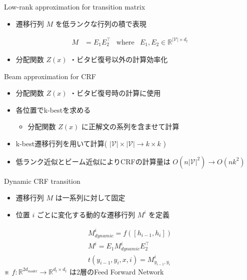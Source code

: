 \documentclass[unicode, 12pt, aspectratio=43]{beamer}
\begin{document}
\begin{frame}[label={sec:org3df3d15}]{\large Low-rank approximation for transition matrix}
\begin{itemize}
\item 遷移行列 \(M\) を低ランクな行列の積で表現
\end{itemize}

\begin{align*}
    M &= E_1 E_2^\top & \mathrm{where} & E_1, E_2 \in \mathbb{R}^{|\mathcal{V}|\times d_t}
\end{align*}
\begin{itemize}
\item 分配関数 \(Z(x)\) ・ビタビ復号以外の計算効率化
\end{itemize}
\end{frame}

\begin{frame}[label={sec:orgf891c50}]{Beam approximation for CRF}
\begin{itemize}
\item 分配関数 \(Z(x)\) ・ビタビ復号時の計算に使用
\item 各位置でk-bestを求める
\begin{itemize}
\item 分配関数 \(Z(x)\) に正解文の系列を含ませて計算
\end{itemize}
\item k-best遷移行列を用いて計算( \(|\mathcal{V}|\times|\mathcal{V}| \rightarrow k \times k\) )
\item 低ランク近似とビーム近似によりCRFの計算量は \(O(n|\mathcal{V}|^2) \rightarrow O(nk^2)\)
\end{itemize}
\end{frame}

\begin{frame}[label={sec:org45b54b5}]{Dynamic CRF transition}
\begin{itemize}
\item 遷移行列 \(M\) は一系列に対して固定
\item 位置 \(i\) ごとに変化する動的な遷移行列 \(M^i\) を定義
\end{itemize}
\begin{align*}
    M_{dynamic}^{i} = f([h_{i-1}, h_i]) \\
    M^i = E_1 M_{dynamic}^i E_2^\top \\
    t(y_{i-1}, y_i, x, i) = M_{y_{i-1}, y_i}^i
\end{align*}
※ \(f: \mathbb{R}^{2d_{model}} \rightarrow \mathbb{R}^{d_t \times d_t}\) は2層のFeed Forward Network
\end{frame}
\end{document}
